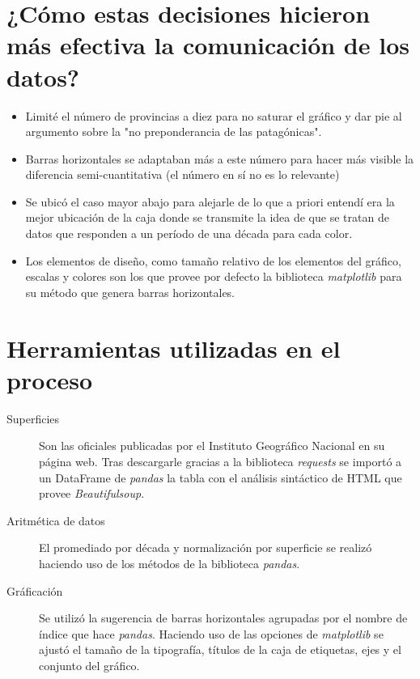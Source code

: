 \documentclass[12pt, spanish, a4paper, landscape]{article}
\begin{document}
\section*{¿Cómo estas decisiones hicieron más efectiva la comunicación de los datos?}
\begin{itemize}
  \item Limité el número de provincias a diez para no saturar el gráfico y dar pie al argumento sobre la "no preponderancia de las patagónicas".
  \item Barras horizontales se adaptaban más a este número para hacer más visible la diferencia semi-cuantitativa (el número en sí no es lo relevante)
  \item Se ubicó el caso mayor abajo para alejarle de lo que a priori entendí era la mejor ubicación de la caja donde se transmite la idea de que se tratan de datos que responden a un período de una década para cada color.
  \item Los elementos de diseño, como tamaño relativo de los elementos del gráfico, escalas y colores son los que provee por defecto la biblioteca \emph{matplotlib} para su método que genera barras horizontales.
\end{itemize}


\section*{Herramientas utilizadas en el proceso}
\begin{description}
  \item[Superficies] 
    Son las oficiales publicadas por el Instituto Geográfico Nacional en su página web. Tras descargarle gracias a la biblioteca \emph{requests} se importó a un DataFrame de \emph{pandas} la tabla con el análisis sintáctico de HTML que provee \emph{Beautifulsoup}.
  \item[Aritmética de datos]
    El promediado por década y normalización por superficie se realizó haciendo uso de los métodos de la biblioteca \emph{pandas}.
  \item[Gráficación]
    Se utilizó la sugerencia de barras horizontales agrupadas por el nombre de índice que hace \emph{pandas}. Haciendo uso de las opciones de \emph{matplotlib} se ajustó el tamaño de la tipografía, títulos de la caja de etiquetas, ejes y el conjunto del gráfico.
\end{description}
\end{document}
